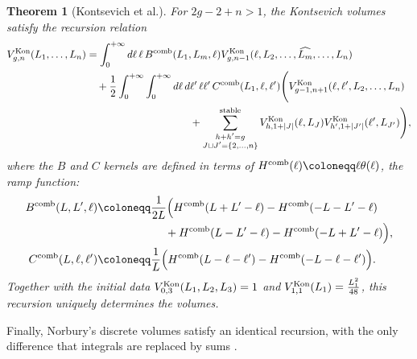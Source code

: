 \documentclass[a4paper,11pt,english]{article}
\theoremstyle{plain}
\newtheorem{theorem}{Theorem}[section]
\theoremstyle{definition}
\theoremstyle{plain}
\begin{document}
\begin{theorem}[Kontsevich et al.]\label{thm:Kon}
    For $2g-2+n > 1$, the Kontsevich volumes satisfy the recursion relation
	\begin{equation}
    \begin{split}
    	V^{\textup{Kon}}_{g,n}(L_1,\ldots,L_n)
    	&=
    	\int_{0}^{+\infty}
    		d\ell \,
    		  \ell \, B^{\textup{comb}}(L_1,L_m,\ell)
    		  V^{\textup{Kon}}_{g,n-1}(\ell,L_2,\dots, \widehat{L_m},\dots, L_n) \\
    	& \quad
    	+ \frac{1}{2} \int_{0}^{+\infty} \int_{0}^{+\infty}
    		d\ell \, d\ell' \,
    		\ell \ell' \, C^{\textup{comb}}(L_1,\ell,\ell') \Bigg(
    			V^{\textup{Kon}}_{g-1,n+1}(\ell,\ell',L_2,\dots,L_n) \\
    	& \qquad\qquad\qquad\qquad\qquad
    			+
    			\sum_{\substack{ h + h' = g \\ J \sqcup J' = \{2,\dots,n\} }}^{\textup{stable}}
    				V^{\textup{Kon}}_{h,1+|J|}(\ell,L_{J})
    				V^{\textup{Kon}}_{h',1+|J'|}(\ell',L_{J'})
    	\Bigg),
    \end{split}
    \end{equation}
	where the $B$ and $C$ kernels are defined in terms of $H^{\textup{comb}}(\ell) \coloneqq \ell \theta(\ell)$, the ramp function:
    \begin{equation}\label{eq:comb:kernels}
    \begin{aligned}
    	B^{\textup{comb}}(L,L',\ell)
    	& \coloneqq
    	\frac{1}{2L} \Bigl(
    		H^{\textup{comb}}(L + L' - \ell)
    		-
    		H^{\textup{comb}}(-L - L' - \ell) \\
    		& \qquad\qquad\qquad
    		+
    		H^{\textup{comb}}(L - L' - \ell)
    		-
    		H^{\textup{comb}}(-L + L' - \ell)
    	\Bigr), \\
    	C^{\textup{comb}}(L,\ell,\ell')
    	& \coloneqq
    	\frac{1}{L} \Bigl(
    		H^{\textup{comb}}(L - \ell - \ell')
    		-
    		H^{\textup{comb}}(-L - \ell - \ell')
    	\Bigr).
    \end{aligned}
    \end{equation}
    Together with the initial data $V^{\textup{Kon}}_{0,3}(L_1,L_2,L_3) = 1$ and $V^{\textup{Kon}}_{1,1}(L_1) = \frac{L_1^2}{48}$, this recursion uniquely determines the volumes.
\end{theorem}

Finally, Norbury's discrete volumes satisfy an identical recursion, with the only difference that integrals are replaced by sums \cite{Nor10}.
\end{document}
